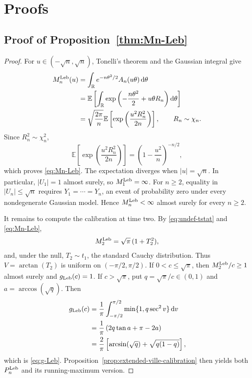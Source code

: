 \section{Proofs}
\label{sec:proofs}

\subsection{Proof of Proposition~\ref{thm:Mn-Leb}}
\label{app:proof-Mn-Leb}

\begin{proof}
For \(u\in(-\sqrt n,\sqrt n)\), Tonelli's theorem and the Gaussian
integral give
\begin{align*}
  M_n^{\mathrm{Leb}}(u)
  &=
  \int_{\mathbb R}
  e^{-n\theta^2/2}A_n(u\theta)\,\mathrm{d}\theta
  \\
  &=
  \mathbb E\left[
    \int_{\mathbb R}
    \exp\left(-\frac{n\theta^2}{2}+u\theta R_n\right)
    \mathrm{d}\theta
  \right]
  \\
  &=
  \sqrt{\frac{2\pi}{n}}
  \mathbb E\left[
    \exp\left(\frac{u^2R_n^2}{2n}\right)
  \right],
  \qquad R_n\sim\chi_n.
\end{align*}
Since \(R_n^2\sim\chi_n^2\),
\[
  \mathbb E\left[
    \exp\left(\frac{u^2R_n^2}{2n}\right)
  \right]
  =
  \left(1-\frac{u^2}{n}\right)^{-n/2},
\]
which proves \eqref{eq:Mn-Leb}. The expectation diverges when
\(|u|=\sqrt n\). In particular, \(|U_1|=1\) almost surely, so
\(M_1^{\mathrm{Leb}}=\infty\). For \(n\geq2\), equality in
\(|U_n|\leq\sqrt n\) requires \(Y_1=\cdots=Y_n\), an event of
probability zero under every nondegenerate Gaussian model. Hence
\(M_n^{\mathrm{Leb}}<\infty\) almost surely for every \(n\geq2\).

It remains to compute the calibration at time two. By
\eqref{eq:undef-tstat} and \eqref{eq:Mn-Leb},
\[
  M_2^{\mathrm{Leb}}
  =
  \sqrt\pi\,(1+T_2^2),
\]
and, under the null, \(T_2\sim t_1\), the standard Cauchy
distribution. Thus \(V=\arctan(T_2)\) is uniform on
\((-\pi/2,\pi/2)\). If \(0<c\leq\sqrt\pi\), then
\(M_2^{\mathrm{Leb}}/c\geq1\) almost surely and \(g_{\mathrm{Leb}}(c)=1\). If
\(c>\sqrt\pi\), put \(q=\sqrt\pi/c\in(0,1)\) and
\(a=\arccos(\sqrt q)\). Then
\begin{align*}
  g_{\mathrm{Leb}}(c)
  &=
  \frac1\pi
  \int_{-\pi/2}^{\pi/2}
  \min\{1,q\sec^2 v\}\,\mathrm{d} v
  \\
  &=
  \frac1\pi
  \left(
    2q\tan a+\pi-2a
  \right)
  \\
  &=
  \frac{2}{\pi}
  \left[
    \arcsin(\sqrt q)+\sqrt{q(1-q)}
  \right],
\end{align*}
which is \eqref{eq:g-Leb}. Proposition~\ref{prop:extended-ville-calibration}
then yields both \(P_n^{\mathrm{Leb}}\) and its running-maximum version.
\end{proof}
